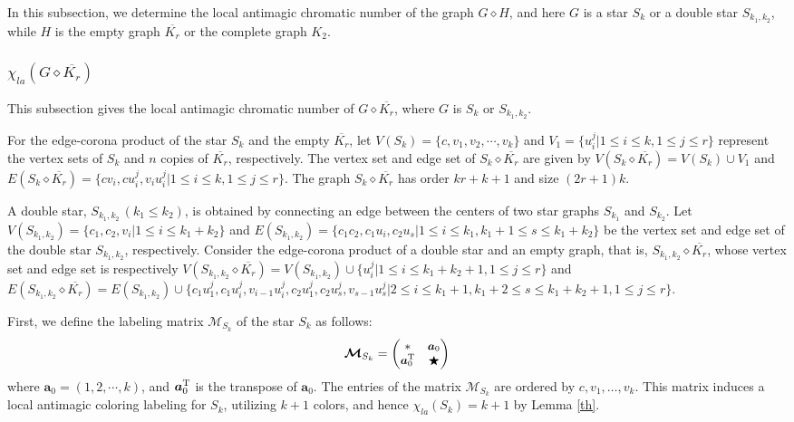 \documentclass[12pt]{article}
\begin{document}
In this subsection, we determine the local antimagic chromatic number of the graph $G\diamond H$, and here $G$ is a star $S_{k}$ or a double star $S_{k_{1},k_{2}}$, while $H$ is the empty graph $\overline{K_{r}}$ or the complete graph $K_{2}$.

\subsubsection{$\chi_{la}(G\diamond \overline{K_{r}})$}

This subsection gives the local antimagic chromatic number of $G\diamond \overline{K_{r}}$, where $G$ is $S_k$ or $S_{k_{1},k_{2}}$.

For the edge-corona product of the star $S_{k}$ and the empty $\overline{K_{r}}$, let $V(S_k)=\{c,v_{1},v_{2},\cdots,v_{k}\}$ and $V_{1}=\{u_{i}^{j}|1\leq i\leq k,1\leq j\leq r\}$  represent the vertex sets of  $S_k$ and $n$ copies of $\overline{K_{r}}$, respectively. The vertex set and edge set of $S_{k}\diamond \overline{K_{r}}$ are given by $V(S_{k}\diamond \overline{K_{r}})=V(S_{k})\cup V_1$ and $E(S_{k}\diamond \overline{K_{r}})=\{cv_{i},cu_{i}^{j},v_{i}u_{i}^{j}|1\leq i\leq k,1\leq j\leq r\}$. The graph $S_{k}\diamond \overline{K_{r}}$ has order $kr+k+1$ and size $(2r+1)k.$

A double star, $S_{k_{1},k_{2}}\,(k_{1}\leq k_{2})$, is obtained by connecting an edge between the centers of two star graphs $S_{k_{1}}$ and $S_{k_{2}}$.
Let $V(S_{k_{1},k_{2}})=\{ c_{1},c_{2},v_{i}|1\leq i\leq k_{1}+k_{2}\}$ and $E(S_{k_{1},k_{2}})=\{c_{1}c_{2},c_{1}u_{i},c_{2}u_{s}|1\leq i\leq k_{1},k_{1}+1\leq s\leq k_{1}+k_{2}\}$ be the vertex set and edge set of the double star $S_{k_{1},k_{2}}$, respectively.
Consider the edge-corona product of a double star and an empty graph, that is, $S_{k_{1},k_{2}}\diamond \overline{K_{r}}$, whose vertex set and edge set is respectively $V(S_{k_{1},k_{2}}\diamond \overline{K_{r}})=V(S_{k_{1},k_{2}})\cup \{u_{i}^{j}|1\leq i\leq k_{1}+k_{2}+1,1\leq j\leq r\}$ and $E(S_{k_{1},k_{2}}\diamond \overline{K_{r}})=E(S_{k_{1},k_{2}})\cup \{c_{1}u_{1}^{j},c_{1}u_{i}^{j},v_{i-1}u_{i}^{j},c_{2}u_{1}^{j},c_{2}u_{s}^{j},v_{s-1}u_{s}^{j}|2\leq i\leq k_{1}+1,k_{1}+2\leq s\leq k_{1}+k_{2}+1,1\leq j\leq r\}$.

First, we define the labeling matrix $\boldsymbol{\mathcal{M}}_{S_{k}}$ of the star $S_{k}$ as follows:
\begin{equation*}
	\boldsymbol{\mathcal{M}}_{S_{k}}={\small
		\begin{pmatrix}
			*& \boldsymbol{a}_{0} \\
			\boldsymbol{a}_{0}^{\rm{T}} & \bigstar
	\end{pmatrix}}
\end{equation*}
where $\boldsymbol{a}_{0}=(1,2,\cdots,k)$, and $\boldsymbol{a}_{0}^{\rm{T}}$ is the transpose of $\boldsymbol{a}_{0}$. The entries of the matrix $\boldsymbol{\mathcal{M}}_{S_{k}}$ are ordered by $c,v_{1},\ldots,v_{k}$. This matrix induces a local antimagic coloring labeling for $S_{k}$, utilizing $k+1$ colors, and hence $\chi_{la}(S_{k})=k+1$ by Lemma \ref{th}.
\end{document}
